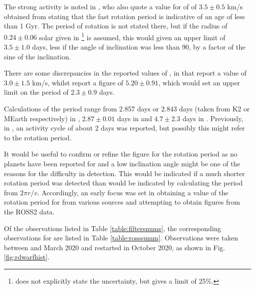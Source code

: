 The strong activity is noted in \citet{wargelin08}, who also quote a value for
{\vsini} of of $3.5 \pm 0.5$ km/s obtained from \citet{johnskrull96} stating
that the fast rotation period is indicative of an age of less than 1 Gyr.
The period of rotation is not stated there, but if
the radius of $0.24 \pm 0.06$ solar given in
\citet{johnson83}\footnote{\citet{johnson83} does not explicitly state the
uncertainty, but gives a limit of 25\%.} is assumed,
this would given an upper limit of $3.5 \pm 1.0$ days, less if the angle of
inclination was less than 90\degree, by a factor of the sine of the inclination.

There are some discrepancies in the reported values of \vsini, in that
\citet{reiners18} report a value of $3.0 \pm 1.5$ km/s, whilst
\citet{hojjatpanah19} report a figure of $5.20 \pm 0.91$, which would set an
upper limit on the period of $2.3 \pm 0.9$ days.

Calculations of the period range from 2.857 days or 2.843 days (taken from K2
or MEarth respectively) in \citet{newton18}, $2.87 \pm 0.01$ days in
\citet{diezalonso19} and $4.7 \pm 2.3$ days in \citet{reiners18}. Previously,
in \citet{jarrett76}, an activity cycle of about 2 days was reported, but
possibly this might refer to the rotation period.

It would be useful to confirm or refine the figure for
the rotation period as no planets have been reported for {\ross}
and a low inclination angle might be one of the
reasons for the difficulty in detection. This would be indicated if a much
shorter rotation period was detected than would be indicated by calculating the
period from $2\pi r / v$. Accordingly, an early focus was set in obtaining a
value of the rotation period for {\ross} from various sources and attempting to
obtain figures from the ROSS2 data.

Of the observations
listed in Table \ref{table:filtersnums}, the corresponding observations for
{\ross} are listed in Table \ref{table:rosssumm}.
Observations were taken between  and March 2020 and
restarted in October 2020, as shown in Fig.
\ref{fig:rdwarfhist}.


